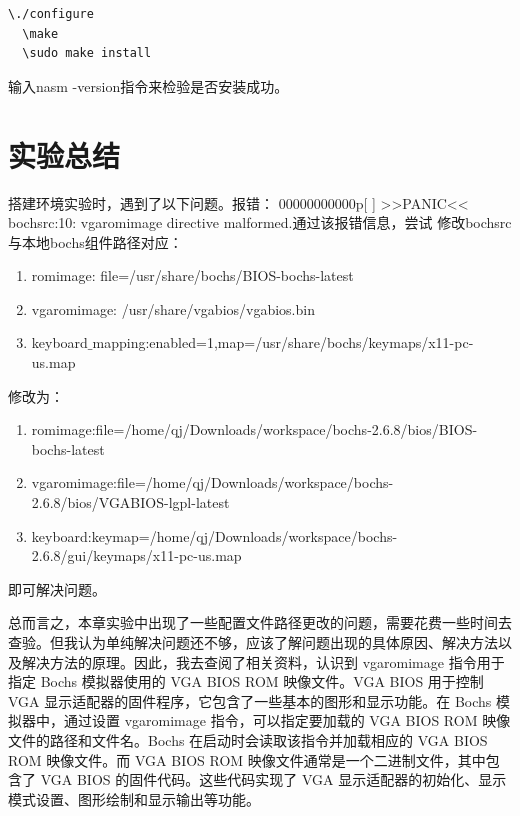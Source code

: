 \begin{lstlisting}[language=bash]
  \./configure
  \make
  \sudo make install
\end{lstlisting}

输入nasm -version指令来检验是否安装成功。

\section{实验总结}

搭建环境实验时，遇到了以下问题。报错：
00000000000p[ ] >>PANIC<< bochsrc:10: vgaromimage directive malformed.通过该报错信息，尝试
修改bochsrc与本地bochs组件路径对应：\par
\begin{enumerate}
    \item romimage: file=/usr/share/bochs/BIOS-bochs-latest
    \item vgaromimage: /usr/share/vgabios/vgabios.bin
    \item keyboard$\_$mapping:enabled=1,map=/usr/share/bochs/keymaps/x11-pc-us.map
\end{enumerate}\par
修改为：
\begin{enumerate}
    \item romimage:file=/home/qj/Downloads/workspace/bochs-2.6.8/bios/BIOS-bochs-latest
    \item vgaromimage:file=/home/qj/Downloads/workspace/bochs-2.6.8/bios/VGABIOS-lgpl-latest
    \item keyboard:keymap=/home/qj/Downloads/workspace/bochs-2.6.8/gui/keymaps/x11-pc-us.map
\end{enumerate}

即可解决问题。\par

总而言之，本章实验中出现了一些配置文件路径更改的问题，需要花费一些时间去查验。但我认为单纯解决问题还不够，应该了解问题出现的具体原因、解决方法以及解决方法的原理。因此，我去查阅了相关资料\cite{romimage}，认识到 vgaromimage 指令用于指定 Bochs 模拟器使用的 VGA BIOS ROM 映像文件。VGA BIOS 用于控制 VGA 显示适配器的固件程序，它包含了一些基本的图形和显示功能。在 Bochs 模拟器中，通过设置 vgaromimage 指令，可以指定要加载的 VGA BIOS ROM 映像文件的路径和文件名。Bochs 在启动时会读取该指令并加载相应的 VGA BIOS ROM 映像文件。而 VGA BIOS ROM 映像文件通常是一个二进制文件，其中包含了 VGA BIOS 的固件代码。这些代码实现了 VGA 显示适配器的初始化、显示模式设置、图形绘制和显示输出等功能。
